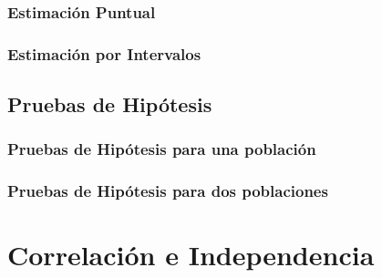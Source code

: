 \documentclass[a4paper, 12pt]{article}
\begin{document}
\subsubsection{Estimación Puntual}

\subsubsection{Estimación por Intervalos}

\subsection{Pruebas de Hipótesis}

\subsubsection{Pruebas de Hipótesis para una población}

\subsubsection{Pruebas de Hipótesis para dos poblaciones}

\newpage

\section{Correlación e Independencia}
\end{document}
